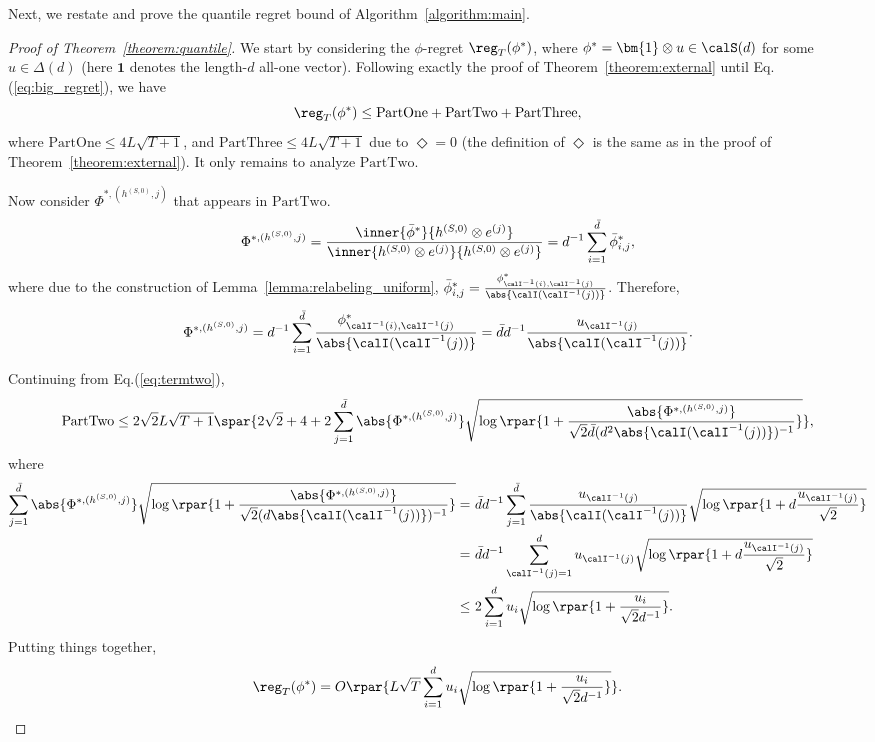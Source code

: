 \documentclass[10pt]{article}
\begin{document}
Next, we restate and prove the quantile regret bound of Algorithm~\ref{algorithm:main}. 

\quantile*

\begin{proof}[Proof of Theorem~\ref{theorem:quantile}]
We start by considering the $\phi$-regret $\reg_T(\phi^*)$, where $\phi^*=\bm{1}\otimes u\in\calS(d)$ for some $u\in\Delta(d)$ (here $\bm{1}$ denotes the length-$d$ all-one vector). Following exactly the proof of Theorem~\ref{theorem:external} until Eq.(\ref{eq:big_regret}), we have
\begin{equation*}
\reg_T(\phi^*)\leq \mathrm{PartOne}+\mathrm{PartTwo}+\mathrm{PartThree},
\end{equation*}
where $\mathrm{PartOne}\leq 4L\sqrt{T+1}$, and $\mathrm{PartThree}\leq 4L\sqrt{T+1}$ due to $\Diamond=0$ (the definition of $\Diamond$ is the same as in the proof of Theorem~\ref{theorem:external}). It only remains to analyze $\mathrm{PartTwo}$. 

Now consider $\Phi^{*,(h^{(S,0)},j)}$ that appears in $\mathrm{PartTwo}$. 
\begin{equation*}
\Phi^{*,(h^{(S,0)},j)}=\frac{\inner{\bar\phi^*}{h^{(S,0)}\otimes e^{(j)}}}{\inner{h^{(S,0)}\otimes e^{(j)}}{h^{(S,0)}\otimes e^{(j)}}}=d^{-1}\sum_{i=1}^{\bar d}\bar\phi^*_{i,j},
\end{equation*}
where due to the construction of Lemma~\ref{lemma:relabeling_uniform}, $\bar\phi^*_{i,j}=\frac{\phi^*_{\calI^{-1}(i),\calI^{-1}(j)}}{\abs{\calI(\calI^{-1}(j))}}$. Therefore, 
\begin{equation*}
\Phi^{*,(h^{(S,0)},j)}=d^{-1}\sum_{i=1}^{\bar d}\frac{\phi^*_{\calI^{-1}(i),\calI^{-1}(j)}}{\abs{\calI(\calI^{-1}(j))}}=\bar dd^{-1}\frac{u_{\calI^{-1}(j)}}{\abs{\calI(\calI^{-1}(j))}}.
\end{equation*}

Continuing from Eq.(\ref{eq:termtwo}),
\begin{equation*}
\mathrm{PartTwo}
\leq 2\sqrt{2}L\sqrt{T+1}\spar{2\sqrt{2}+4+2\sum_{j=1}^{\bar d}\abs{\Phi^{*,(h^{(S,0)},j)}}\sqrt{\log\rpar{1+\frac{\abs{\Phi^{*,(h^{(S,0)},j)}}}{\sqrt{2}\bar d(d^2\abs{\calI(\calI^{-1}(j))})^{-1}}}}},
\end{equation*}
where
\begin{align*}
\sum_{j=1}^{\bar d}\abs{\Phi^{*,(h^{(S,0)},j)}}\sqrt{\log\rpar{1+\frac{\abs{\Phi^{*,(h^{(S,0)},j)}}}{\sqrt{2}(d\abs{\calI(\calI^{-1}(j))})^{-1}}}}
=~&\bar dd^{-1}\sum_{j=1}^{\bar d}\frac{u_{\calI^{-1}(j)}}{\abs{\calI(\calI^{-1}(j))}}\sqrt{\log\rpar{1+d\frac{u_{\calI^{-1}(j)}}{\sqrt{2}}}}\\
=~&\bar dd^{-1}\sum_{\calI^{-1}(j)=1}^{d}u_{\calI^{-1}(j)}\sqrt{\log\rpar{1+d\frac{u_{\calI^{-1}(j)}}{\sqrt{2}}}}\\
\leq~& 2\sum_{i=1}^{d}u_{i}\sqrt{\log\rpar{1+\frac{u_{i}}{\sqrt{2}d^{-1}}}}.
\end{align*}
Putting things together, 
\begin{equation*}
\reg_T(\phi^*)=O\rpar{L\sqrt{T}\sum_{i=1}^{d}u_{i}\sqrt{\log\rpar{1+\frac{u_{i}}{\sqrt{2}d^{-1}}}}}.
\end{equation*}


\end{proof}
\end{document}
